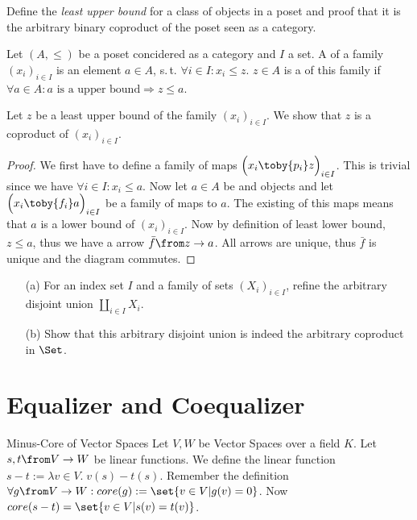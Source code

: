 \begin{exercise}
  Define the \emph{least upper bound} for a class of objects in a poset and proof that it is the arbitrary binary coproduct of the poset seen as a category.
\end{exercise}

\begin{answer}
  Let $(A, \le)$ be a poset concidered as a category and $I$ a set.
  A  of a family $(x_i)_{i\in I}$ is an element $a \in A$, s.\,t. $\forall i \in I: x_i \le z$.
  $z \in A$ is a  of this family if $\forall a \in A: \text{$a$ is a upper bound} \Rightarrow z \le a$.

  Let $z$ be a least upper bound of the family $(x_i)_{i\in I}$. We show that $z$ is a coproduct of $(x_i)_{i\in I}$.
  \begin{proof}
    We first have to define a family of maps $\Bigl(x_i \toby{p_i} z\Bigr)_{i \in I}$.
    This is trivial since we have $\forall i \in I: x_i \le a$.
    Now let $a \in A$ be and objects and let $\Bigl(x_i \toby{f_i} a\Bigr)_{i \in I}$ be a family of maps to $a$.
    The existing of this maps means that $a$ is a lower bound of $(x_i)_{i\in I}$.
    Now by definition of least lower bound, $z \le a$, thus we have a arrow $\bar{f} \from z \to a$.
    All arrows are unique, thus $\bar{f}$ is unique and the diagram commutes. \qedhere
  \end{proof}
\end{answer}

\begin{exercise}
  \begin{itemize}
    \item[(a)]For an index set $I$ and a family of sets $(X_i)_{i \in I}$, refine the arbitrary disjoint union $\coprod_{i \in I}{X_i}$.
    \item[(b)]Show that this arbitrary disjoint union is indeed the arbitrary coproduct in $\Set$.
  \end{itemize}
\end{exercise}

\section{Equalizer and Coequalizer}

\begin{definition}{Minus-Core of Vector Spaces}
  Let $V, W$ be Vector Spaces over a field $K$. Let $s, t \from V \to W$ be linear functions.
  We define the linear function $s - t := \lambda v\in V. \; v(s) - t(s)$.
  Remember the definition $\forall g \from V \to W: core(g) := \set{ v \in V | g(v) = 0 }$.
  Now $core (s - t) = \set{v \in V | s(v) = t (v) }$.
\end{definition}

